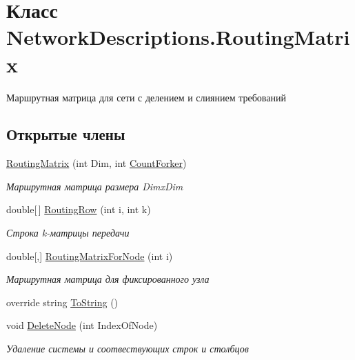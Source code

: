\hypertarget{class_network_descriptions_1_1_routing_matrix}{}\section{Класс Network\+Descriptions.\+Routing\+Matrix}
\label{class_network_descriptions_1_1_routing_matrix}


Маршрутная матрица для сети с делением и слиянием требований  


\subsection*{Открытые члены}
\begin{DoxyCompactItemize}
\item 
\hyperlink{class_network_descriptions_1_1_routing_matrix_add98014b6965f5679a0aaeda89b446bd}{Routing\+Matrix} (int Dim, int \hyperlink{class_network_descriptions_1_1_routing_matrix_a38f3c4bb00bf84fdeb4fd2c3dbdc9bfb}{Count\+Forker})
\begin{DoxyCompactList}\small\item\em Маршрутная матрица размера Dimx\+Dim \end{DoxyCompactList}\item 
double\mbox{[}$\,$\mbox{]} \hyperlink{class_network_descriptions_1_1_routing_matrix_aab9481fcca1c6b37fbe29f32cdf3dc83}{Routing\+Row} (int i, int k)
\begin{DoxyCompactList}\small\item\em Строка k-\/матрицы передачи \end{DoxyCompactList}\item 
double\mbox{[},\mbox{]} \hyperlink{class_network_descriptions_1_1_routing_matrix_ac861d6d51c5507ca96cca4cf29b4a02c}{Routing\+Matrix\+For\+Node} (int i)
\begin{DoxyCompactList}\small\item\em Маршрутная матрица для фиксированного узла \end{DoxyCompactList}\item 
override string \hyperlink{class_network_descriptions_1_1_routing_matrix_a08fa3960104e8189d799f415594602f4}{To\+String} ()
\item 
void \hyperlink{class_network_descriptions_1_1_routing_matrix_ae26be8d879fc6b41bc0e66eeeaae9580}{Delete\+Node} (int Index\+Of\+Node)
\begin{DoxyCompactList}\small\item\em Удаление системы и соотвествующих строк и столбцов \end{DoxyCompactList}\item 

\end{DoxyCompactItemize}
